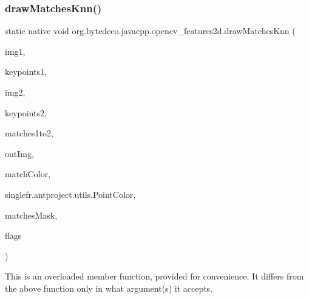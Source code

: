 \subsubsection{\texorpdfstring{draw\+Matches\+Knn()}{drawMatchesKnn()}}
{\footnotesize\ttfamily static native void org.\+bytedeco.\+javacpp.\+opencv\+\_\+features2d.\+draw\+Matches\+Knn (\begin{DoxyParamCaption}\item[{@By\+Val Mat}]{img1,  }\item[{@Const @By\+Ref Key\+fr.antproject.utils.Point\+Vector}]{keypoints1,  }\item[{@By\+Val Mat}]{img2,  }\item[{@Const @By\+Ref Key\+fr.antproject.utils.Point\+Vector}]{keypoints2,  }\item[{@Const @By\+Ref D\+Match\+Vector\+Vector}]{matches1to2,  }\item[{@By\+Val Mat}]{out\+Img,  }\item[{@Const @By\+Ref(null\+Value=\char`\"{}cv\+::\+Scalar\+::all(-\/1)\char`\"{}) Scalar}]{match\+Color,  }\item[{@Const @By\+Ref(null\+Value=\char`\"{}cv\+::\+Scalar\+::all(-\/1)\char`\"{}) Scalar}]{single\+fr.antproject.utils.Point\+Color,  }\item[{@Cast(\char`\"{}const std\+::vector$<$std\+::vector$<$char$>$ $>$$\ast$\char`\"{}) @By\+Ref(null\+Value=\char`\"{}std\+::vector$<$std\+::vector$<$char$>$ $>$()\char`\"{}) Byte\+Vector\+Vector}]{matches\+Mask,  }\item[{int}]{flags }\end{DoxyParamCaption})\hspace{0.3cm}{\ttfamily [static]}}

This is an overloaded member function, provided for convenience. It differs from the above function only in what argument(s) it accepts. 